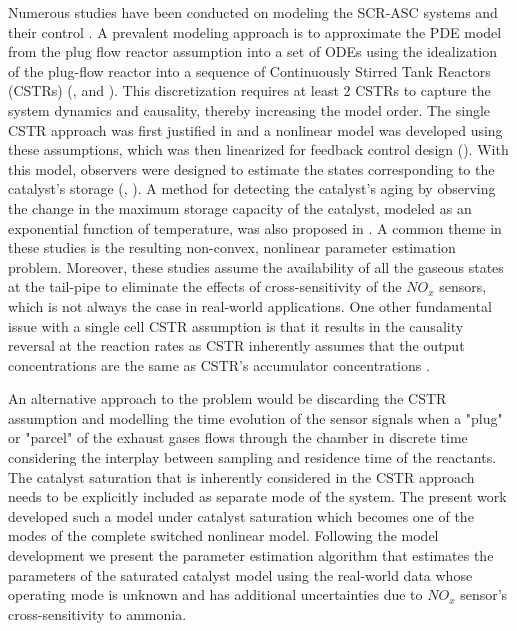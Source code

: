 Numerous studies have been conducted on modeling the SCR-ASC systems and their control \cite{yuan2015diesel}. A
prevalent modeling approach is to approximate the PDE model from the plug flow reactor assumption into a set of ODEs
using the idealization of the plug-flow reactor into a sequence of Continuously Stirred Tank Reactors (CSTRs)
(\cite{hsieh2011development}, and \cite{nova2014urea}). This discretization requires at least 2 CSTRs to capture the
system dynamics and causality, thereby increasing the model order. The single CSTR approach was first justified in
\cite{devarakonda2008adequacy} and a nonlinear model was developed using these assumptions, which was then linearized
for feedback control design (\cite{devarakonda2009model}). With this model, observers were designed to estimate the
states corresponding to the catalyst's storage (\cite{ma2017observer}, \cite{jain2020term}). A method for detecting the
catalyst's aging by observing the change in the maximum storage capacity of the catalyst, modeled as an exponential
function of temperature, was also proposed in \cite{ma2017observer}. A common theme in these studies is the resulting
non-convex, nonlinear parameter estimation problem. Moreover, these studies assume the availability of all the gaseous
states at the tail-pipe to eliminate the effects of cross-sensitivity of the $NO_x$ sensors, which is not always the
case in real-world applications. One other fundamental issue with a single cell CSTR assumption is that it results in
the causality reversal at the reaction rates as CSTR inherently assumes that the output concentrations are the same as
CSTR's accumulator concentrations \cite{charla2024reduced}.

An alternative approach to the problem would be discarding the CSTR assumption and modelling the time evolution of the
sensor signals when a "plug" or "parcel" of the exhaust gases flows through the chamber in discrete time considering the
interplay between sampling and residence time of the reactants. The catalyst saturation that is inherently considered in
the CSTR approach needs to be explicitly included as separate mode of the system. The present work developed such a
model under catalyst saturation which becomes one of the modes of the complete switched nonlinear model. Following the
model development we present the parameter estimation algorithm that estimates the parameters of the saturated catalyst
model using the real-world data whose operating mode is unknown and has additional uncertainties due to $NO_x$ sensor's
cross-sensitivity to ammonia.
